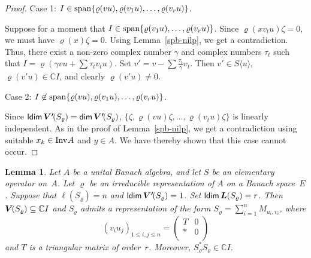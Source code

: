 \documentclass[a4paper,12pt,reqno]{amsart}
\numberwithin{equation}{section}
\newtheorem{lem}[thm]{Lemma}
\theoremstyle{definition}
\begin{document}
\begin{proof}
\smallskip\noindent
Case 1: $I \in {{\rm span}} \{ \varrho (vu), \varrho (v_1 u), \ldots, \varrho (v_ru) \}$.

\noindent
Suppose for a moment that $ I \in {{\rm span}} \{ \varrho( v_1 u), \ldots, \varrho (v_r u)\}$.
Since $\varrho (x v_t u) \zeta=0$, we must have $\varrho(x) \zeta=0$. Using Lemma~\ref{spb-nilp}, we get  a contradiction.
Thus, there exist a non-zero complex number $\gamma$ and complex numbers $\tau_t$ such that
$I= \varrho (\gamma vu + \sum \tau_t v_t u)$. Set  $v'=v- \sum \frac{\tau_t}{\gamma} v_t$.
Then  $v' \in {S} \langle u \rangle$, $\varrho (v'u) \in {\mathbb{C}} I$, and clearly $\varrho (v'u ) \neq 0$.

\smallskip\noindent
Case 2:  $I \not \in {{\rm span}} \{ \varrho (vu), \varrho (v_1 u), \ldots, \varrho (v_r u)\}$.

\noindent
Since $ {{\sf ldim}\,}{{\bm{V'}\mkern-2.5mu(S_\varrho)}}= {{\sf dim}\,}{{\bm{V'}\mkern-2.5mu(S_\varrho)}}$, $\{ \zeta, \varrho( vu) \zeta, \ldots, \varrho(v_t u) \zeta \}$
is linearly independent. As in the proof of Lemma~\ref{spb-nilp},  we get a contradiction using suitable $x_k\in{{\textup{Inv}\kern.5pt A}}$ and $y\in A$.
We have thereby shown that this case cannot occur.
\end{proof}
\begin{lem}\label{lem:ldimV'=1}
Let $A$ be a unital Banach algebra, and let $S$ be  an  elementary operator on~$A$.
Let $\varrho$ be an irreducible representation of $A$ on a Banach space~$E$.
Suppose that $\ell(S_\varrho)=n$ and\/  ${{\sf ldim}\,}{{\bm{V'}\mkern-2.5mu(S_\varrho)}}= 1$. Set ${{\sf ldim}\,}{{\bm L(S_\varrho)}}=r$.
Then ${{\bm V\mkern-2.5mu(S_\varrho)}}\subseteq {\mathbb{C}} I$ and $S_\varrho$ admits a representation of the form $S_\varrho= \sum_{i=1}^n M_{u_i,v_i}$, where
\begin{equation*}
(v_i u_j)_{1 \leq i,j \leq n}= \left(
                                   \begin{array}{cc}
                                     T & 0 \\
                                     * & 0 \\
                                   \end{array}
                                 \right)
\end{equation*}
 and $T$ is a triangular  matrix of order~$r$. Moreover, $S_\varrho^* S_\varrho^{}\in{\mathbb{C}} I$.
\end{lem}
\end{document}
